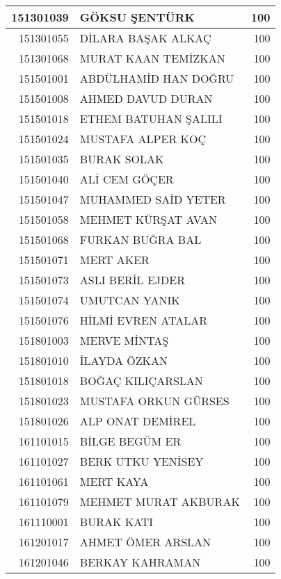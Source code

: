\documentclass[12pt]{article}
\begin{document}
\begin{longtable}{||r||l||r||}
    \midrule
    151301039 & GÖKSU ŞENTÜRK & 100 \\
    \midrule
    151301055 & DİLARA BAŞAK ALKAÇ & 100 \\
    \midrule
    151301068 & MURAT KAAN TEMİZKAN & 100 \\
    \midrule
    151501001 & ABDÜLHAMİD HAN DOĞRU & 100 \\
    \midrule
    151501008 & AHMED DAVUD DURAN & 100 \\
    \midrule
    151501018 & ETHEM BATUHAN ŞALILI & 100 \\
    \midrule
    151501024 & MUSTAFA ALPER KOÇ & 100 \\
    \midrule
    151501035 & BURAK SOLAK & 100 \\
    \midrule
    151501040 & ALİ CEM GÖÇER & 100 \\
    \midrule
    151501047 & MUHAMMED SAİD YETER & 100 \\
    \midrule
    151501058 & MEHMET KÜRŞAT AVAN & 100 \\
    \midrule
    151501068 & FURKAN BUĞRA BAL & 100 \\
    \midrule
    151501071 & MERT AKER & 100 \\
    \midrule
    151501073 & ASLI BERİL EJDER & 100 \\
    \midrule
    151501074 & UMUTCAN YANIK & 100 \\
    \midrule
    151501076 & HİLMİ EVREN ATALAR & 100 \\
    \midrule
    151801003 & MERVE MİNTAŞ & 100 \\
    \midrule
    151801010 & İLAYDA ÖZKAN & 100 \\
    \midrule
    151801018 & BOĞAÇ KILIÇARSLAN & 100 \\
    \midrule
    151801023 & MUSTAFA ORKUN GÜRSES & 100 \\
    \midrule
    151801026 & ALP ONAT DEMİREL & 100 \\
    \midrule
    161101015 & BİLGE BEGÜM ER & 100 \\
    \midrule
    161101027 & BERK UTKU YENİSEY & 100 \\
    \midrule
    161101061 & MERT KAYA & 100 \\
    \midrule
    161101079 & MEHMET MURAT AKBURAK & 100 \\
    \midrule
    161110001 & BURAK KATI & 100 \\
    \midrule
    161201017 & AHMET ÖMER ARSLAN & 100 \\
    \midrule
    161201046 & BERKAY KAHRAMAN & 100 \\

\end{longtable}
\end{document}
